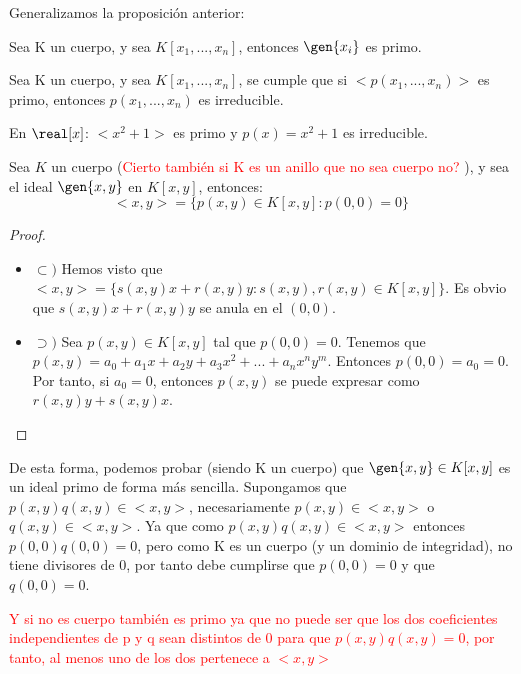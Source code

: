 Generalizamos la proposición anterior:
\begin{prop}
	Sea K un cuerpo, y sea $K[x_1,...,x_n]$, entonces $\gen{x_i}$ es primo.
\end{prop}

\begin{prop}
	Sea K un cuerpo, y sea $K[x_1,...,x_n]$, se cumple que si $<p(x_1,...,x_n)>$ es primo,  entonces $p(x_1,...,x_n)$ es irreducible.
\end{prop}

\begin{example}
	En $\real[x]$: $<x^2+1>$ es primo y $p(x)=x^2+1$ es irreducible.
\end{example}

\begin{prop}
	Sea $K$ un cuerpo (\textcolor{red}{Cierto también si K es un anillo que no sea cuerpo no?} ), y sea el ideal $\gen{x,y}$ en $K[x,y]$, entonces:
	$$<x,y>=\{p(x,y)\in K[x,y]:p(0,0)=0 \}$$
\end{prop}

\begin{proof}
	\begin{itemize}
		\item $\subset)$ Hemos visto que $<x,y>=\{s(x,y) x+r(x,y) y: s(x,y),r(x,y) \in K[x,y] \}$. Es obvio que $s(x,y) x+r(x,y) y$ se anula en el $(0,0)$.
		\item $\supset)$ Sea $p(x,y) \in K[x,y]$ tal que $p(0,0)=0$. Tenemos que $p(x,y)=a_0+a_1x+a_2y+a_3x^2+...+a_nx^ny^m$. Entonces $p(0,0)=a_0=0$. Por tanto, si $a_0=0$, entonces $p(x,y)$ se puede expresar como $r(x,y)y+s(x,y)x$.
	\end{itemize}
\end{proof}

\obs De esta forma, podemos probar (siendo K un cuerpo) que $\gen{x,y} \in K[x,y]$ es un ideal primo de forma más sencilla. Supongamos que $p(x,y)q(x,y) \in <x,y>$, necesariamente $p(x,y) \in <x,y>$ o $q(x,y) \in <x,y>$. Ya que como $p(x,y)q(x,y) \in <x,y>$ entonces $p(0,0)q(0,0)=0$, pero como K es un cuerpo (y un dominio de integridad), no tiene divisores de 0, por tanto debe cumplirse que $p(0,0)=0$ y que $q(0,0)=0$.

\textcolor{red}{Y si no es cuerpo también es primo ya que no puede ser que los dos coeficientes independientes de p y q sean distintos de 0 para que $p(x,y)q(x,y)=0$, por tanto, al menos uno de los dos pertenece a $<x,y>$}

